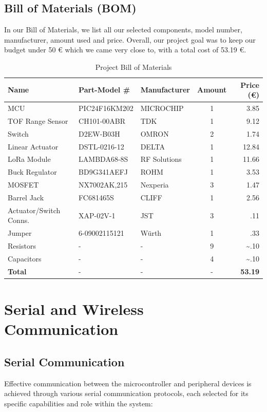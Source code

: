 \documentclass[12pt,a4paper]{article}
\begin{document}
\subsection{Bill of Materials (BOM)}
In our Bill of Materials, we list all our selected components, model number, manufacturer, amount used and price. Overall, our project goal was to keep our budget under 50 € which we came very close to, with a total cost of 53.19 €. 
\begin{table}[h]
    \centering
    \begin{tabular}{|l|l|l|c|r|}
    \hline
    \textbf{Name} & \textbf{Part-Model \#} & \textbf{Manufacturer} & \textbf{Amount} & \textbf{Price (€)} \\ \hline
    MCU & PIC24F16KM202 & MICROCHIP & 1 & 3.85 \\ \hline
    TOF Range Sensor & CH101-00ABR & TDK & 1 & 9.12 \\ \hline
    Switch & D2EW-B03H & OMRON & 2 & 1.74 \\ \hline
    Linear Actuator & DSTL-0216-12 & DELTA & 1 & 12.84 \\ \hline
    LoRa Module & LAMBDA68-8S & RF Solutions & 1 & 11.66 \\ \hline
    Buck Regulator & BD9G341AEFJ & ROHM & 1 & 3.53 \\ \hline
    MOSFET & NX7002AK,215 & Nexperia & 3 & 1.47 \\ \hline
    Barrel Jack & FC681465S & CLIFF  & 1 & 2.56 \\ \hline
    Actuator/Switch Conns. & XAP-02V-1 & JST & 3 & .11 \\ \hline
    Jumper & 6-09002115121 & Würth & 1 & .33 \\ \hline
    Resistors & - & - & 9 & \textasciitilde.10 \\ \hline
    Capacitors & - & - & 4 & \textasciitilde.10 \\ \hline
    \textbf{Total} & - & - & - & \textbf{53.19} \\ \hline
    \end{tabular}
    \caption{Project Bill of Materials}
    \label{tab:bom}
    \end{table}

    \section{Serial and Wireless Communication}
    \subsection{Serial Communication}
    Effective communication between the microcontroller and peripheral devices is achieved through various serial communication protocols, each selected for its specific capabilities and role within the system:
    
\end{document}
